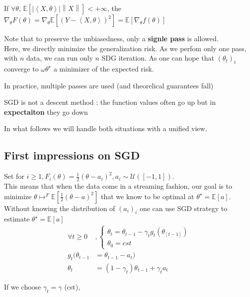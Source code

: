  If $\forall \theta $, $\mathbb{E}[\left| \left\langle X, \theta \right\rangle  \right| \left\| X \right\| ] < + \infty $, the $\nabla _{\theta } F(\theta) = \nabla_{\theta} \mathbb{E}[(Y - \left\langle X, \theta \right\rangle )^2] = \mathbb{E}[\nabla _{\theta}f(\theta)]$

Note that to preserve the unbiasedness, only a \textbf{signle pass} is allowed. \\
Here, we directly minimize the generalization risk. As we perfom only one pass, with $ n $ data, we can run only $ n $ SDG iteration. As one can hope that $ (\theta _t)_t $ converge to $ \omega \theta ^\star  $ a minimizer of the expected risk.

In practice, multiple passes are used (and theorelical guarantees fall)

\begin{note}
    SGD is not a descent method : the function values often go up but in \textbf{expectaiton} they go down
\end{note}

In what follows we will handle both situations with a unified view.

\subsection{First impressions on SGD}
Set for $ i \geq 1, F_i (\theta ) = \frac{1}{2}(\theta  - a_i)^2, a_i \sim \mathcal{U}([-1, 1]) $.\\
This means that when the data come in a streaming fashion, our goal is to minimize $ \theta \mapsto ^F \mathbb{E} [ \frac{1}{2} (\theta  - a) ^2] $ that we know to be optimal at $ \theta ^\star = \mathbb{E}[a] $. \\
Without knowing the distribution of $ (a_i)_i $ one can use SGD strategy to estimate $ \theta ^\star = \mathbb{E}[a] $ 
\begin{align*}
    \forall t \geq 0&, \begin{cases}
        \theta _t = \theta _{t-1} - \gamma _t g_t (\theta _[t-1]) \\
        \theta _0 = cst
    \end{cases} \\
    g_t(\theta _{t-1} &= \theta _{t-1} - a_t) \\
    \theta _t &= (1 - \gamma _t) \theta _{t-1} + \gamma _t a_t 
\end{align*}

If we choose $\gamma_t = \gamma$ (cst),

